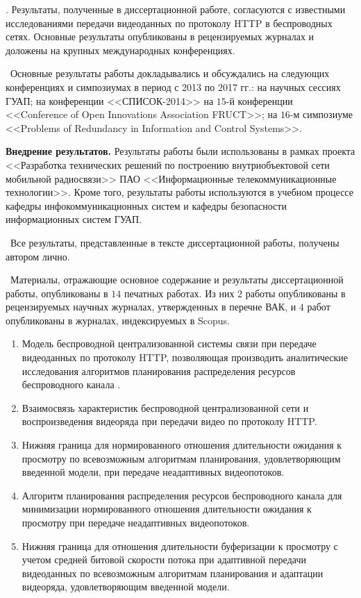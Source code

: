 \reliability. Результаты, полученные в диссертационной работе, согласуются с известными исследованиями передачи видеоданных по протоколу HTTP в беспроводных сетях. Основные результаты опубликованы в рецензируемых журналах и доложены на крупных международных конференциях.

\probation\ Основные результаты работы докладывались и обсуждались на следующих конференциях и симпозиумах в период с 2013 по 2017 гг.: на научных сессиях ГУАП; на конференции <<СПИСОК-2014>> на $15$-й конференции <<Conference of Open Innovations Association FRUCT>>; на $16$-м симпозиуме <<Problems of Redundancy in Information and Control Systems>>.

\textbf{Внедрение результатов.} Результаты работы были использованы в рамках проекта <<Разработка технических решений по построению внутриобъектовой сети мобильной радиосвязи>> ПАО <<Информационные телекоммуникационные технологии>>. Кроме того, результаты работы используются в учебном процессе кафедры инфокоммуникационных систем и кафедры безопасности информационных систем ГУАП.

\contribution\ Все результаты, представленные в тексте диссертационной работы, получены автором лично.

\publications\ Материалы, отражающие основное содержание и результаты диссертационной работы, опубликованы в $14$ печатных работах. Из них $2$ работы опубликованы в рецензируемых научных журналах, утвержденных в перечне ВАК, и $4$ работ опубликованы в журналах, индексируемых в Scopus.

\begin{enumerate}
    \item Модель беспроводной централизованной системы связи при передаче видеоданных по протоколу HTTP, позволяющая производить аналитические исследования алгоритмов планирования распределения ресурсов беспроводного канала .
    \item Взаимосвязь характеристик беспроводной централизованной сети и воспроизведения видеоряда при передачи видео по протоколу HTTP.
    \item Нижняя граница для нормированного отношения длительности ожидания к просмотру по всевозможным алгоритмам планирования, удовлетворяющим введенной модели, при передаче неадаптивных видеопотоков.
    \item Алгоритм планирования распределения ресурсов беспроводного канала для минимизации нормированного отношения длительности ожидания к просмотру при передаче неадаптивных видеопотоков.
    \item Нижняя граница для отношения длительности буферизации к просмотру с учетом средней битовой скорости потока при адаптивной передачи видеоданных по всевозможным алгоритмам планирования и адаптации видеоряда, удовлетворяющим введенной модели.
\end{enumerate}

